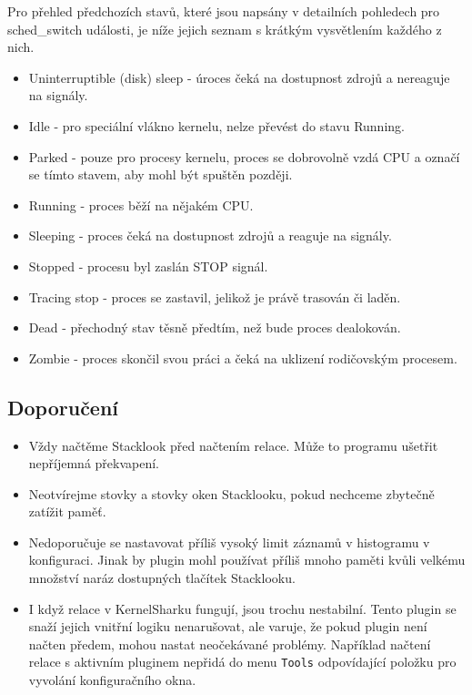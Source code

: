 Pro přehled předchozích stavů, které jsou napsány v detailních pohledech pro sched\_switch události, je níže jejich seznam s krátkým vysvětlením každého z nich.
\begin{itemize}
  \item Uninterruptible (disk) sleep - úroces čeká na dostupnost zdrojů a nereaguje na signály.
  \item Idle - pro speciální vlákno kernelu, nelze převést do stavu Running.
  \item Parked - pouze pro procesy kernelu, proces se dobrovolně vzdá CPU a označí se tímto stavem, aby mohl být spuštěn později. 
  \item Running - proces běží na nějakém CPU.
  \item Sleeping - proces čeká na dostupnost zdrojů a reaguje na signály.
  \item Stopped - procesu byl zaslán STOP signál.
  \item Tracing stop - proces se zastavil, jelikož je právě trasován či laděn.
  \item Dead - přechodný stav těsně předtím, než bude proces dealokován.
  \item Zombie - proces skončil svou práci a čeká na uklizení rodičovským procesem.
\end{itemize}

\subsection{Doporučení}

\begin{itemize}
  \item Vždy načtěme Stacklook před načtením relace. Může to programu ušetřit nepříjemná překvapení.
  \item Neotvírejme stovky a stovky oken Stacklooku, pokud nechceme zbytečně zatížit paměť.
  \item Nedoporučuje se nastavovat příliš vysoký limit záznamů v histogramu v konfiguraci. Jinak by plugin mohl používat příliš mnoho paměti kvůli velkému množství naráz dostupných tlačítek Stacklooku.
  \item I když relace v KernelSharku fungují, jsou trochu nestabilní. Tento plugin se snaží jejich vnitřní logiku nenarušovat, ale varuje, že pokud plugin není načten předem, mohou nastat neočekávané problémy. Například načtení relace s aktivním pluginem nepřidá do menu \texttt{Tools} odpovídající položku pro vyvolání konfiguračního okna.
\end{itemize}

